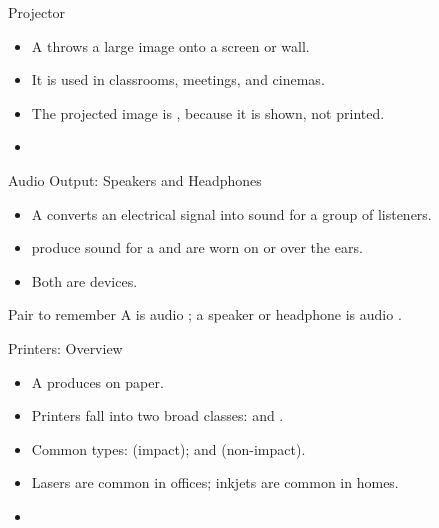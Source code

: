\documentclass[aspectratio=169]{beamer}
\begin{document}
\begin{frame}{Projector}
  \begin{itemize}
    \item A  throws a large image onto a screen or wall.
    \item It is used in classrooms, meetings, and cinemas.
    \item The projected image is , because it is shown, not
      printed.
    \item {}
  \end{itemize}
\end{frame}

\begin{frame}{Audio Output: Speakers and Headphones}
  \begin{itemize}
    \item A  converts an electrical signal into sound for a
      group of listeners.
    \item {} produce sound for a  and are
      worn on or over the ears.
    \item Both are  devices.
  \end{itemize}
  \begin{block}{Pair to remember}
    A  is audio ; a speaker or headphone is audio
    .
  \end{block}
\end{frame}

\begin{frame}{Printers: Overview}
  \begin{itemize}
    \item A  produces  on paper.
    \item Printers fall into two broad classes:  and
      .
    \item Common types:  (impact);  and
       (non-impact).
    \item Lasers are common in offices; inkjets are common in homes.
    \item {}
  \end{itemize}
\end{frame}
\end{document}

